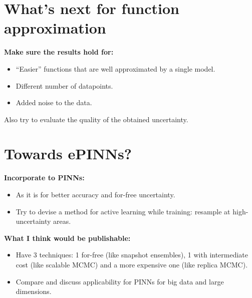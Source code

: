 \section{What's next for function approximation}
\noindent
\textbf{Make sure the results hold for:}
\begin{itemize}
	\item ``Easier'' functions that are well approximated by a single model.
	\item Different number of datapoints.
	\item Added noise to the data.
\end{itemize}
Also try to evaluate the quality of the obtained uncertainty.

\section{Towards ePINNs?}
\noindent
\textbf{Incorporate to PINNs:}
\begin{itemize}
	\item As it is for better accuracy and for-free uncertainty.
	\item Try to devise a method for active learning while training: resample at high-uncertainty areas.
\end{itemize}
\noindent
\textbf{What I think would be publishable:}
\begin{itemize}
	\item Have 3 techniques: 1 for-free (like snapshot ensembles), 1 with intermediate cost (like scalable MCMC) and a more expensive one (like replica MCMC). 
	\item Compare and discuss applicability for PINNs for big data and large dimensions.
\end{itemize}


	
\printbibliography[heading=bibintoc,title={References}]
	
